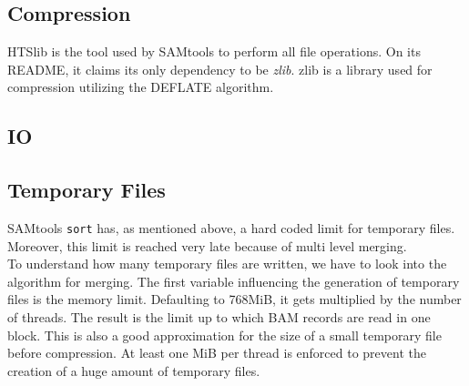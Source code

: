 \subsection{Compression}
HTSlib is the tool used by SAMtools to perform all file operations. On its README, it claims its only dependency to be \textit{zlib}. zlib is a library used for compression utilizing the DEFLATE algorithm. 

\subsection{IO}


\subsection{Temporary Files}
SAMtools \texttt{sort} has, as mentioned above, a hard coded limit for temporary files. Moreover, this limit is reached very late because of multi level merging. \\
To understand how many temporary files are written, we have to look into the algorithm for merging. The first variable influencing the generation of temporary files is the memory limit. Defaulting to 768MiB, it gets multiplied by the number of threads. The result is the limit up to which BAM records are read in one block. This is also a good approximation for the size of a small temporary file before compression. At least one MiB per thread is enforced to prevent the creation of a huge amount of temporary files. 